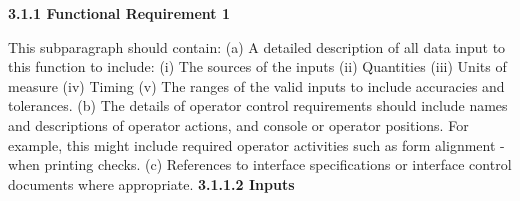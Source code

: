 



\textbf{3.1.1 Functional Requirement 1}


\begin{comment}
This subparagraph should provide a description of 
the purpose of the function and the approaches and techniques
employed. It should contain any introductory
or background material which might clarify the
intent of the function
\textbf{3.1.1.1 Introduction}  
\end{comment}


This subparagraph should contain:
(a) A detailed description of all data input
to this function to include:
	(i) The sources of the inputs
	(ii) Quantities
	(iii) Units of measure
	(iv) Timing
	(v) The ranges of the valid inputs to include accuracies and tolerances.
(b) The details of operator control requirements should include names and descriptions
of operator actions, and console or operator
positions. For example, this might include
required operator activities such as form alignment - when printing checks.
(c) References to interface specifications or
interface control documents where appropriate.
\textbf{3.1.1.2 Inputs}


\begin{comment}
This subparagraph should define all of the operations to be performed on
the input data and intermediate parameters to
obtain the output. It includes specification of:
(a) Validity checks on the input data
(b) The exact sequence of operations to in-
clude timing of events
(c) Responses to abnormal situations, for
example:
	(i) Overflow
	(ii) Communication failure
	(iii) Error handling
(d) Parameters affected by the operations
(e) Requirements for degraded operation
(f) Any methods (for example, equations,
mathematical algorithms, and logical opera-
tions) which must be used to transform the sys-
tem inputs into corresponding outputs. For
example, this might specify:
(i) The formula for computing the with-
holding tax in a payroll package
(ii) A least squares curve fitting technique
for a plotting package
(iii) A meteorological model t o be used
for a weather forecasting package
(g) Validity checks on the output data
\textbf{3.1.1.3 Processing} 
\end{comment}


